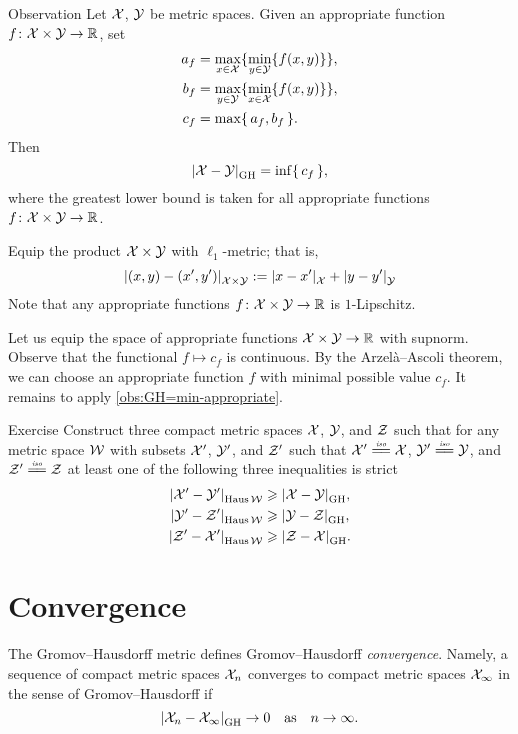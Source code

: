 \begin{thm}{Observation}\label{obs:GH=min-appropriate}
Let $\mathcal{X}$, $\mathcal{Y}$ be metric spaces.
Given an appropriate function $f\colon\mathcal{X}\times\mathcal{Y}\to\mathbb{R}$, set 
\begin{align*}
a_f&=\max_{x\in \mathcal{X}}\{\min_{y\in\mathcal{Y}} \{f(x,y)\}\},
\\
b_f&=\max_{y\in \mathcal{Y}}\{\min_{x\in\mathcal{X}} \{f(x,y)\}\},
\\
c_f&=\max\{\,a_f,b_f\,\}.
\end{align*}
Then 
\[\dist{\spc{X}}{\spc{Y}}{\GH}=\inf\{\,c_f\,\},\]
where the greatest lower bound is taken for all appropriate functions $f\colon\mathcal{X}\times\mathcal{Y}\to\mathbb{R}$.
\end{thm}

Equip the product $\mathcal{X}\times\mathcal{Y}$ with $\ell_1$-metric;
that is,
\[\dist{(x,y)}{(x',y')}{\spc{X}\times\spc{Y}}
\df
\dist{x}{x'}{\spc{X}}+\dist{y}{y'}{\spc{Y}}\]
Note that any appropriate functions $f\colon\mathcal{X}\times\mathcal{Y}\to\mathbb{R}$ is $1$-Lipschitz.

Let us equip the space of appropriate functions $\mathcal{X}\times\mathcal{Y}\to\mathbb{R}$ with supnorm.
Observe that the functional $f\mapsto c_f$ is continuous.
By the Arzelà--Ascoli theorem, we can choose an appropriate function $f$ 
with minimal possible value $c_f$.
It remains to apply \ref{obs:GH=min-appropriate}.
\qeds

\begin{thm}{Exercise}\label{ex:XYZ}
Construct three compact metric spaces $\mathcal{X}$, $\mathcal{Y}$, and $\mathcal{Z}$
such that for any metric space $\mathcal{W}$
with subsets $\mathcal{X}'$, $\mathcal{Y}'$, and $\mathcal{Z}'$ such that 
$\spc{X}'\iso\spc{X}$, $\spc{Y}'\iso\spc{Y}$, and $\spc{Z}'\iso\spc{Z}$
at least one of the following three inequalities is strict
\begin{align*}
\dist{\spc{X}'}{\spc{Y}'}{\Haus\spc{W}}&\ge \dist{\spc{X}}{\spc{Y}}{\GH},
\\
\dist{\spc{Y}'}{\spc{Z}'}{\Haus\spc{W}}&\ge\dist{\spc{Y}}{\spc{Z}}{\GH},
\\
\dist{\spc{Z}'}{\spc{X}'}{\Haus\spc{W}}&\ge\dist{\spc{Z}}{\spc{X}}{\GH}.
\end{align*}
\end{thm}

\section{Convergence}

The Gromov--Hausdorff metric defines Gromov--Hausdorff \emph{convergence}.
Namely, a sequence of compact metric spaces $\mathcal{X}_n$ converges to compact metric spaces $\mathcal{X}_\infty$ in the sense of Gromov--Hausdorff if 
\[\dist{\spc{X}_n}{\spc{X}_\infty}{\GH}\to 0\quad\text{as}\quad n\to\infty.\]


